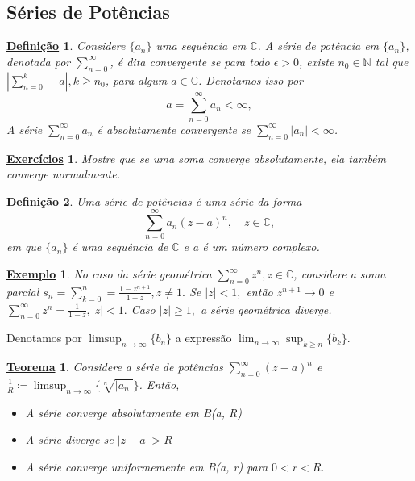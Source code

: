 \documentclass{article}
\newtheorem*{def*}{\underline{Defini\c c\~ao}}
\newtheorem*{theorem*}{\underline{Teorema}}
\newtheorem{example}{\underline{Exemplo}}[section]
\newtheorem*{exer*}{\underline{Exerc\'icios}}
\begin{document}
  \subsection{S\'eries de Pot\^encias}
  \begin{def*}
    Considere $\{a_{n}\}$ uma sequ\^encia em $\mathbb{C}$. A s\'erie de pot\^encia em $\{a_n\}$, denotada
    por $\sum\limits_{n=0}^{\infty}$, \'e dita convergente se para todo $\epsilon > 0$, existe $n_0\in\mathbb{N}$
    tal que $|\sum\limits_{n=0}^{k} - a|, k\geq{n_0}$, para algum $a\in\mathbb{C}$. Denotamos isso por 
    $$
    a = \sum_{n=0}^{\infty} a_n < \infty,
    $$
    A s\'erie $\sum\limits_{n=0}^{\infty}a_n$ \'e absolutamente convergente se $\sum\limits_{n=0}^{\infty}|a_n|<\infty$.
  \end{def*}
  \begin{exer*}
    Mostre que se uma soma converge absolutamente, ela tamb\'em converge normalmente.
  \end{exer*}
  \begin{def*}
    Uma s\'erie de pot\^encias \'e uma s\'erie da forma
    $$
    \sum_{n=0}^{\infty}a_n(z-a)^n, \quad z\in\mathbb{C},
    $$
    em que $\{a_n\}$ \'e uma sequ\^encia de $\mathbb{C}$ e a \'e um n\'umero complexo.
  \end{def*}
  \begin{example}
    No caso da s\'erie geom\'etrica $\sum\limits_{n=0}^{\infty}z^n, z\in\mathbb{C}$, considere
    a soma parcial $s_n = \sum\limits_{k=0}^{n} = \frac{1 - z^{n+1}}{1-z}, z\neq{1}.$ Se
    $|z| < 1,$ ent\~ao $z^{n+1}\to{0}$ e $\sum\limits_{n=0}^{\infty}z^n = \frac{1}{1-z}, |z| < 1.$
    Caso $|z|\geq{1},$ a s\'erie geom\'etrica diverge.
  \end{example}
  Denotamos por $\limsup_{n\to\infty}\{b_n\}$ a express\~ao $\lim_{n\to\infty}\sup_{k\geq{n}}\{b_k\}$.
  \begin{theorem*}
    Considere a s\'erie de pot\^encias $\sum\limits_{n=0}^{\infty}(z-a)^n$ e $\frac{1}{R}\coloneqq \limsup_{n\to\infty}\{\sqrt[n]{|a_n|}\}$.
    Ent\~ao, 
    \begin{itemize}
      \item[1)] A s\'erie converge absolutamente em B(a, R)
      \item[2)] A s\'erie diverge se $|z-a| > R$
      \item[3)] A s\'erie converge uniformemente em B(a, r) para $0 < r < R.$
    \end{itemize}
  \end{theorem*}
\end{document}
